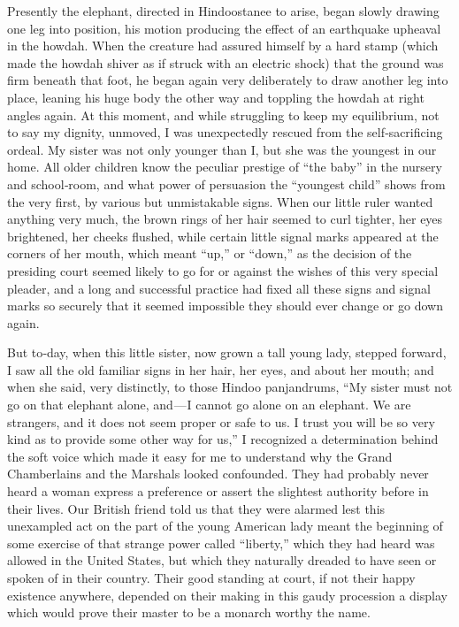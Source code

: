 \documentclass[12pt]{book}
\begin{document}
Presently the elephant, directed in Hindoostanee to arise, began slowly drawing one leg into position, his motion producing the effect of an earthquake upheaval in the howdah. When the creature had assured himself by a hard stamp
(which made the howdah shiver as if struck with an electric shock) that the
ground was firm beneath that foot, he began again very deliberately to draw
another leg into place, leaning his huge body the other way and toppling the
howdah at right angles again. At this moment, and while struggling to keep my
equilibrium, not to say my dignity, unmoved, I was unexpectedly rescued from
the self‐sacrificing ordeal. My sister was not only younger than I, but she was the
youngest in our home. All older children know the peculiar prestige of “the baby”
in the nursery and school‐room, and what power of persuasion the “youngest
child” shows from the very first, by various but unmistakable signs. When our
little ruler wanted anything very much, the brown rings of her hair seemed to
curl tighter, her eyes brightened, her cheeks flushed, while certain little signal
marks appeared at the corners of her mouth, which meant “up,” or “down,” as the
decision of the presiding court seemed likely to go for or against the wishes of
this very special pleader, and a long and successful practice had fixed all these
signs and signal marks so securely that it seemed impossible they should ever
change or go down again.

But to‐day, when this little sister, now grown a tall young lady, stepped
forward, I saw all the old familiar signs in her hair, her eyes, and about her mouth;
and when she said, very distinctly, to those Hindoo panjandrums, “My sister must
not go on that elephant alone, and — I cannot go alone on an elephant. We are
strangers, and it does not seem proper or safe to us. I trust you will be so very
kind as to provide some other way for us,” I recognized a determination behind the
soft voice which made it easy for me to understand why the Grand Chamberlains
and the Marshals looked confounded. They had probably never heard a woman
express a preference or assert the slightest authority before in their lives. Our
British friend told us that they were alarmed lest this unexampled act on the part
of the young American lady meant the beginning of some exercise of that strange
power called “liberty,” which they had heard was allowed in the United States, but
which they naturally dreaded to have seen or spoken of in their country. Their
good standing at court, if not their happy existence anywhere, depended on their
making in this gaudy procession a display which would prove their master to be
a monarch worthy the name.
\end{document}

